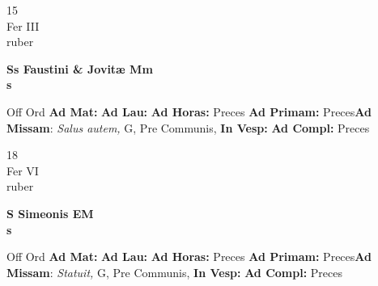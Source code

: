 \documentclass[10pt, openany]{book}
\begin{document}
        \begin{center}
            \begin{minipage}{3.5in}
                \vspace{2em}
                \begin{minipage}{0.5in}
                    {\Huge 15} \\
                    {\normalsize Fer III} \\
                    {\normalsize ruber}
                \end{minipage}
                \begin{minipage}{3.0in}
                    \textbf{ \large Ss Faustini \& Jovitæ Mm \\
                    \textnormal{\normalsize s}} \\ 
                \end{minipage}
                \begin{justify}Off Ord
                    \textbf{Ad Mat: }
                    \textbf{Ad Lau: }
                    \textbf{Ad Horas: }Preces
                    \textbf{Ad Primam: }Preces\textbf{Ad Missam}: \textit{Salus autem,} G, Pre Communis,  
                    \textbf{In Vesp: }
                    \textbf{Ad Compl: }Preces
                \end{justify}
            \end{minipage}
        \end{center}
    
        \begin{center}
            \begin{minipage}{3.5in}
                \vspace{2em}
                \begin{minipage}{0.5in}
                    {\Huge 18} \\
                    {\normalsize Fer VI} \\
                    {\normalsize ruber}
                \end{minipage}
                \begin{minipage}{3.0in}
                    \textbf{ \large S Simeonis EM \\
                    \textnormal{\normalsize s}} \\ 
                \end{minipage}
                \begin{justify}Off Ord
                    \textbf{Ad Mat: }
                    \textbf{Ad Lau: }
                    \textbf{Ad Horas: }Preces
                    \textbf{Ad Primam: }Preces\textbf{Ad Missam}: \textit{Statuit,} G, Pre Communis,  
                    \textbf{In Vesp: }
                    \textbf{Ad Compl: }Preces
                \end{justify}
            \end{minipage}
        \end{center}
    
\end{document}
